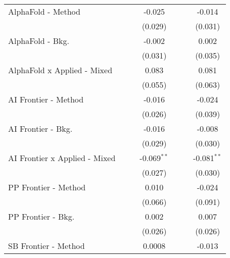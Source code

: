 \begin{tabular}{lcccccc}
   AlphaFold - Method             &         &                & -0.025        &              &              & -0.014\\   
                                  &         &                & (0.029)       &              &              & (0.031)\\   
   AlphaFold - Bkg.               &         &                & -0.002        &              &              & 0.002\\   
                                  &         &                & (0.031)       &              &              & (0.035)\\   
   AlphaFold x Applied - Mixed    &         &                & 0.083         &              &              & 0.081\\   
                                  &         &                & (0.055)       &              &              & (0.063)\\   
   AI Frontier - Method           &         &                & -0.016        &              &              & -0.024\\   
                                  &         &                & (0.026)       &              &              & (0.039)\\   
   AI Frontier - Bkg.             &         &                & -0.016        &              &              & -0.008\\   
                                  &         &                & (0.029)       &              &              & (0.030)\\   
   AI Frontier x Applied - Mixed  &         &                & -0.069$^{**}$ &              &              & -0.081$^{**}$\\   
                                  &         &                & (0.027)       &              &              & (0.030)\\   
   PP Frontier - Method           &         &                & 0.010         &              &              & -0.024\\   
                                  &         &                & (0.066)       &              &              & (0.091)\\   
   PP Frontier - Bkg.             &         &                & 0.002         &              &              & 0.007\\   
                                  &         &                & (0.026)       &              &              & (0.026)\\   
   SB Frontier - Method           &         &                & 0.0008        &              &              & -0.013\\   

\end{tabular}
